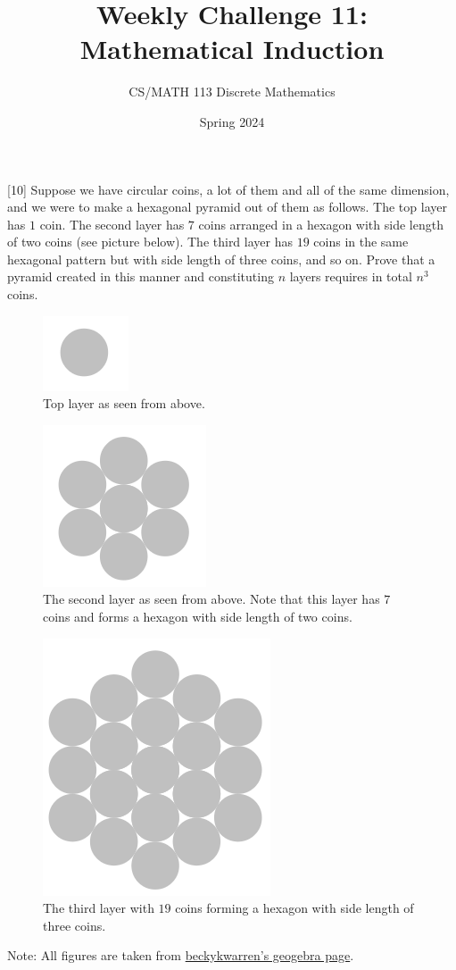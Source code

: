 \documentclass[a4paper]{exam}
\title{Weekly Challenge 11: Mathematical Induction}
\author{CS/MATH 113 Discrete Mathematics}
\date{Spring 2024}
\begin{document}
\maketitle

\begin{questions}
  [10]
  Suppose we have circular coins, a lot of them and all of the same dimension, and we were to make a hexagonal pyramid out of them as follows. The top layer has $1$ coin. The second layer has $7$ coins arranged in a hexagon with side length of two coins (see picture below). The third layer has $19$ coins in the same hexagonal pattern but with side length of three coins, and so on. Prove that a pyramid created in this manner and constituting $n$ layers requires in total $n^3$ coins.
  \begin{figure}[h!]
    \centerline{\includegraphics{layer1}}
    \caption{Top layer as seen from above.}
    \label{layer1}
  \end{figure}
  \begin{figure}[h!]
    \centerline{\includegraphics{layer2.png}}
    \caption{The second layer as seen from above. Note that this layer has $7$ coins and forms a hexagon with side length of two coins.}
    \label{layer2}
  \end{figure}
  \newpage
  \begin{figure}[h!]
    \centerline{\includegraphics{layer3.png}}
    \caption{The third layer with $19$ coins forming a hexagon with side length of three coins.}
    \label{layer3}
  \end{figure}

  Note: All figures are taken from \href{https://www.geogebra.org/m/cnqdjcph}{beckykwarren's geogebra page}.

  \begin{solution}
  \end{solution}


\end{questions}
\end{document}
